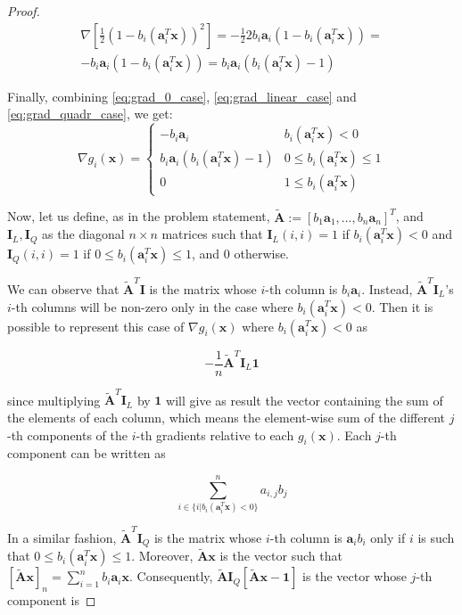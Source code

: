 \documentclass[12pt]{article}
\newcommand{\xb}{\mathbf{x}}
\newcommand{\ab}{\mathbf{a}}
\newcommand{\abi}{\ab_i}
\newcommand{\sumin}{\sum_{i = 1}^n}
\newcommand{\ax}{\abi^T\xb}
\newcommand{\atilde}{\mathbf{\tilde{A}}}
\newcommand{\id}{\mathbf{I}}
\newcommand{\ones}{\mathbf{1}}
\begin{document}
\begin{proof}
\begin{gather}
    \nabla \left [\frac{1}{2}(1 - b_i(\ax))^2\right] = \nonumber
    -\frac{1}{2} 2 b_i\abi(1 - b_i(\ax)) = \\ \label{eq:grad_quadr_case}
    -b_i\abi(1 - b_i(\ax)) = b_i\abi(b_i(\ax) - 1)
\end{gather}

Finally, combining \eqref{eq:grad_0_case}, \eqref{eq:grad_linear_case} and \eqref{eq:grad_quadr_case}, we get:
\begin{equation}
    \nabla g_i(\xb) = \begin{cases}
            -b_i\abi                & b_i(\ax) < 0 \\
            b_i\abi(b_i(\ax) - 1)   & 0 \leq b_i(\ax) \leq 1 \\
            0                       & 1 \le b_i(\ax)
    \end{cases}
\end{equation}

Now, let us define, as in the problem statement, $\atilde:=[b_1\ab_1, ..., b_n\ab_n]^T$, and $\id_L, \id_Q$ as the diagonal $n \times n$ matrices such that $\id_L(i,i) = 1$ if $b_i(\ax) < 0$ and $\id_Q(i,i) = 1$ if $0 \leq b_i(\ax) \leq 1$, and $0$ otherwise.

We can observe that $\atilde^T\id$ is the matrix whose $i$-th column is $b_i\abi$. Instead, $\atilde^T\id_L$'s $i$-th columns will be non-zero only in the case where $b_i(\ax) < 0$. Then it is possible to represent this case of $\nabla g_i(\xb)$ where $b_i(\ax) < 0$ as

\begin{equation} \label{eq:grad_matrix_linear_case}
    -\frac{1}{n}\atilde^T\id_L\ones
\end{equation}

since multiplying $\atilde^T\id_L$ by $\ones$ will give as result the vector containing the sum of the elements of each column, which means the element-wise sum of the different $j$-th components of the $i$-th gradients relative to each $g_i(\xb)$. Each $j$-th component can be written as

\begin{equation*}
    \sum_{i \in \{i | b_i(\ax) < 0\}}^{n} a_{i,j} b_j
\end{equation*}

In a similar fashion, $\atilde^T\id_Q$ is the matrix whose $i$-th column is $\abi b_i$ only if $i$ is such that $0 \leq b_i(\ax) \leq 1$. Moreover, $\atilde \xb$ is the vector such that $[\atilde \xb]_n = \sumin b_i\abi\xb$. Consequently, $\atilde\id_Q[\atilde \xb - \ones]$ is the vector whose $j$-th component is


\end{proof}
\end{document}
